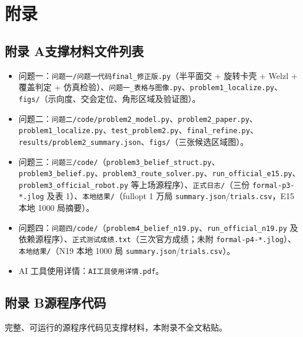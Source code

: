\documentclass[12pt,a4paper]{article}
\begin{document}
\clearpage
\section*{附录}
\subsection*{附录 A\quad 支撑材料文件列表}
\begin{itemize}
\item 问题一：\texttt{问题一/问题一代码final\_修正版.py}（半平面交 + 旋转卡壳 + Welzl + 覆盖判定 + 仿真检验）、\texttt{问题一\_表格与图像.py}、\texttt{problem1\_localize.py}、\texttt{figs/}（示向度、交会定位、角形区域及验证图）。
\item 问题二：\texttt{问题二/code/problem2\_model.py}、\texttt{problem2\_paper.py}、\texttt{problem1\_localize.py}、\texttt{test\_problem2.py}、\texttt{final\_refine.py}、\texttt{results/problem2\_summary.json}、\texttt{figs/}（三张候选区域图）。
\item 问题三：\texttt{问题三/code/}（\texttt{problem3\_belief\_struct.py}、\texttt{problem3\_belief.py}、\texttt{problem3\_route\_solver.py}、\texttt{run\_official\_e15.py}、\texttt{problem3\_official\_robot.py} 等上场源程序）、\texttt{正式日志/}（三份 \texttt{formal-p3-*.jlog} 及表 1）、\texttt{本地结果/}（fullopt 1 万局 \texttt{summary.json}/\texttt{trials.csv}，E15 本地 1000 局摘要）。
\item 问题四：\texttt{问题四/code/}（\texttt{problem4\_belief\_n19.py}、\texttt{run\_official\_n19.py} 及依赖源程序）、\texttt{正式测试成绩.txt}（三次官方成绩；未附 \texttt{formal-p4-*.jlog}）、\texttt{本地结果/}（N19 本地 1000 局 \texttt{summary.json}/\texttt{trials.csv}）。
\item AI 工具使用详情：\texttt{AI工具使用详情.pdf}。
\end{itemize}

\subsection*{附录 B\quad 源程序代码}
完整、可运行的源程序代码见支撑材料，本附录不全文粘贴。
\end{document}
